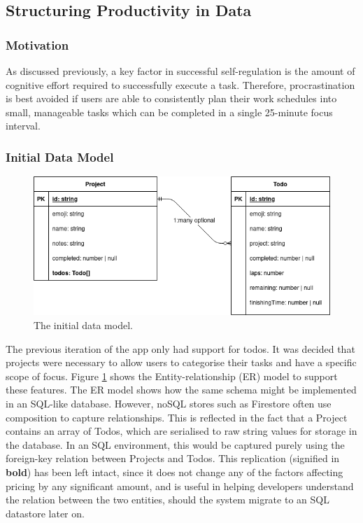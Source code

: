 \subsection{Structuring Productivity in Data}
\subsubsection{Motivation}
As discussed previously, a key factor in successful self-regulation is the amount of cognitive effort required to successfully execute a task. Therefore, procrastination is best avoided if users are able to consistently plan their work schedules into small, manageable tasks which can be completed in a single 25-minute focus interval. 

\subsubsection{Initial Data Model}
\begin{figure}[h]
    \begin{center}
        \includegraphics[scale=0.5]{images/initial_data_model.png}
    \end{center}
    \caption{The initial data model.}
    \label{fig:initial_data_model}
\end{figure}

The previous iteration of the app only had support for todos. It was decided that projects were necessary to allow users to categorise their tasks and have a specific scope of focus. Figure \ref{fig:initial_data_model} shows the Entity-relationship (ER) model to support these features. The ER model shows how the same schema might be implemented in an SQL-like database. However, noSQL stores such as Firestore often use composition to capture relationships. This is reflected in the fact that a Project contains an array of Todos, which are serialised to raw string values for storage in the database. In an SQL environment, this would be captured purely using the foreign-key relation between Projects and Todos. This replication (signified in \textbf{bold}) has been left intact, since it does not change any of the factors affecting pricing by any significant amount, and is useful in helping developers understand the relation between the two entities, should the system migrate to an SQL datastore later on.

